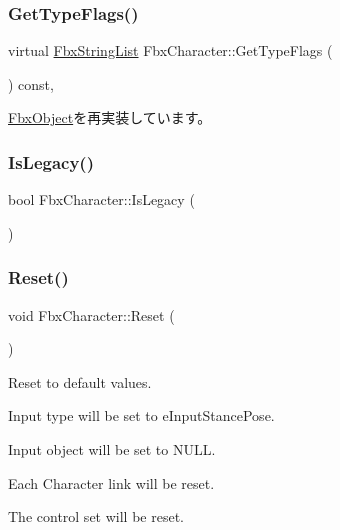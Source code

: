 \mbox{\label{class_fbx_character_ab0b957ac50d562eb146fff27e0f6b937}} 
\subsubsection{\texorpdfstring{Get\+Type\+Flags()}{GetTypeFlags()}}
{\footnotesize\ttfamily virtual \hyperlink{class_fbx_string_list}{Fbx\+String\+List} Fbx\+Character\+::\+Get\+Type\+Flags (\begin{DoxyParamCaption}{ }\end{DoxyParamCaption}) const\hspace{0.3cm}{\ttfamily [protected]}, {\ttfamily [virtual]}}



\hyperlink{class_fbx_object_a6d30a5d00400039a248977cf9f9255b2}{Fbx\+Object}を再実装しています。

\mbox{\label{class_fbx_character_abdabb0d27c98299f041fb9b6344aad50}} 
\subsubsection{\texorpdfstring{Is\+Legacy()}{IsLegacy()}}
{\footnotesize\ttfamily bool Fbx\+Character\+::\+Is\+Legacy (\begin{DoxyParamCaption}{ }\end{DoxyParamCaption})}

\mbox{\label{class_fbx_character_a1ee11d659b9fb685b13018d1df9c2dd5}} 
\subsubsection{\texorpdfstring{Reset()}{Reset()}}
{\footnotesize\ttfamily void Fbx\+Character\+::\+Reset (\begin{DoxyParamCaption}{ }\end{DoxyParamCaption})}

Reset to default values.
\begin{DoxyItemize}
\item Input type will be set to e\+Input\+Stance\+Pose.
\item Input object will be set to N\+U\+LL.
\item Each Character link will be reset.
\item The control set will be reset. 
\end{DoxyItemize}\mbox{\label{class_fbx_character_a3530f7289a38b392b9cff0e084e94ff7}} 
